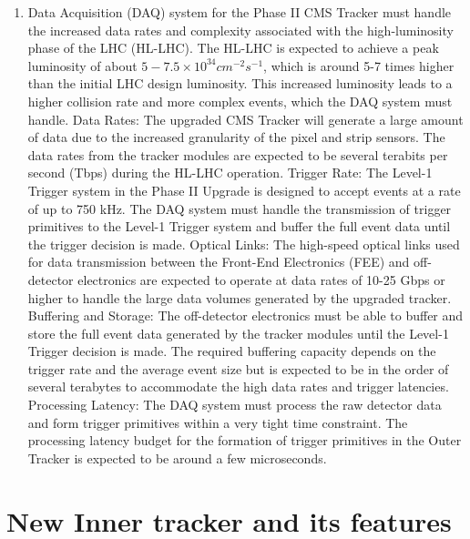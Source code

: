\begin{enumerate}
\item Data Acquisition (DAQ) system for the Phase II CMS Tracker must handle the increased data rates and complexity associated with the high-luminosity phase of the LHC (HL-LHC). The HL-LHC is expected to achieve a peak luminosity of about $5-7.5 \times 10^{34} cm^{-2}s^{-1}$, which is around 5-7 times higher than the initial LHC design luminosity. This increased luminosity leads to a higher collision rate and more complex events, which the DAQ system must handle. Data Rates: The upgraded CMS Tracker will generate a large amount of data due to the increased granularity of the pixel and strip sensors. The data rates from the tracker modules are expected to be several terabits per second (Tbps) during the HL-LHC operation. Trigger Rate: The Level-1 Trigger system in the Phase II Upgrade is designed to accept events at a rate of up to 750 kHz. The DAQ system must handle the transmission of trigger primitives to the Level-1 Trigger system and buffer the full event data until the trigger decision is made. Optical Links: The high-speed optical links used for data transmission between the Front-End Electronics (FEE) and off-detector electronics are expected to operate at data rates of 10-25 Gbps or higher to handle the large data volumes generated by the upgraded tracker. Buffering and Storage: The off-detector electronics must be able to buffer and store the full event data generated by the tracker modules until the Level-1 Trigger decision is made. The required buffering capacity depends on the trigger rate and the average event size but is expected to be in the order of several terabytes to accommodate the high data rates and trigger latencies. Processing Latency: The DAQ system must process the raw detector data and form trigger primitives within a very tight time constraint. The processing latency budget for the formation of trigger primitives in the Outer Tracker is expected to be around a few microseconds.

\end{enumerate}

\section{New Inner tracker and its features}
\label{sec:tepx}


